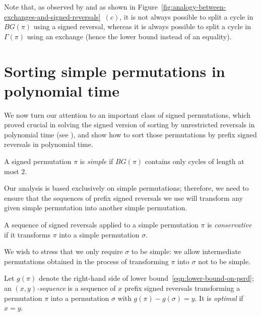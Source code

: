 \documentclass[review]{elsarticle}
\begin{document}
Note that, as observed by \citet{hannenhalli-transforming} and as shown in Figure~\ref{fig:analogy-between-exchanges-and-signed-reversals}~$(c)$, it is not always possible to split a cycle in $BG(\pi)$ using a signed reversal, whereas it is always possible to split a cycle in $\Gamma(\pi)$ using an exchange (hence the lower bound instead of an equality).


\section{Sorting simple permutations in polynomial time}

We now turn our attention to an important class of signed permutations, which proved crucial in solving the signed version of sorting by unrestricted reversals in polynomial time (see \citet{hannenhalli-transforming}), and show how to sort those permutations by prefix signed reversals in polynomial time.

\begin{definition}
A signed permutation $\pi$ is \emph{simple} if $BG(\pi)$ contains only cycles of length at most $2$.
\end{definition}

Our analysis is based exclusively on simple permutations; therefore, we need to ensure that the sequences of prefix signed reversals we use will transform any given simple permutation into another simple permutation.

\begin{definition}
A sequence of signed reversals applied to a simple permutation $\pi$ is \emph{conservative} if it transforms $\pi$ into a simple permutation $\sigma$.
\end{definition}

We wish to stress that we only require $\sigma$ to be simple: we allow intermediate permutations obtained in the process of transforming $\pi$ into $\sigma$ not to be simple.

\begin{definition}
Let $g(\pi)$ denote the right-hand side of lower bound~\eqref{eqn:lower-bound-on-psrd}; an \emph{$(x,y)$-sequence} is a sequence of $x$ prefix signed reversals transforming a permutation $\pi$ into a permutation $\sigma$ with $g(\pi)-g(\sigma)=y$. It is \emph{optimal} if $x=y$.
\end{definition}
\end{document}
